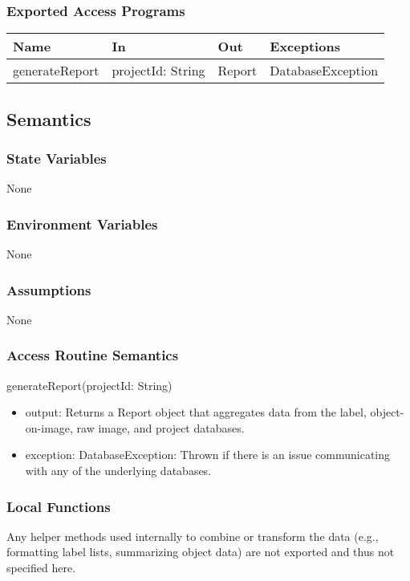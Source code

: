 \documentclass[12pt, titlepage]{article}
\begin{document}
\subsubsection{Exported Access Programs}
\begin{center}\begin{tabular}{p{3cm} p{4cm} p{3cm} p{3cm}}
\hline\textbf{Name} & \textbf{In} & \textbf{Out} & \textbf{Exceptions} \\
\hline
    generateReport & projectId: String & Report & DatabaseException \\
\hline
\end{tabular}\end{center}

\subsection{Semantics}
\subsubsection{State Variables}
    None

\subsubsection{Environment Variables}
    None

\subsubsection{Assumptions}
    None

\subsubsection{Access Routine Semantics}
    \noindent generateReport(projectId: String)
    \begin{itemize}
        \item output: Returns a Report object that aggregates data from the label, object-on-image, raw image, and project databases.
        \item exception: DatabaseException: Thrown if there is an issue communicating with any of the underlying databases.
    \end{itemize}

\subsubsection{Local Functions}
    Any helper methods used internally to combine or transform the data (e.g., formatting label lists, summarizing object data) are not exported and thus not specified here.
\end{document}
